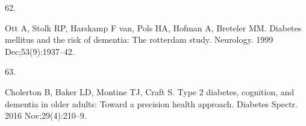 \documentclass[
  a4paper,
]{article}
\newlength{\cslhangindent}
\newlength{\csllabelwidth}
\newlength{\cslentryspacingunit} %
\newenvironment{CSLReferences}[2] %
 {%
  \setlength{\parindent}{0pt}
  \ifodd #1
  \let\oldpar\par
  \def\par{\hangindent=\cslhangindent\oldpar}
  \fi
  \setlength{\parskip}{#2\cslentryspacingunit}
 }%
 {}
\newcommand{\CSLLeftMargin}[1]{\parbox[t]{\csllabelwidth}{#1}}
\newcommand{\CSLRightInline}[1]{\parbox[t]{\linewidth - \csllabelwidth}{#1}\break}
\begin{document}
\begin{CSLReferences}{0}{0}
\leavevmode{}%
\CSLLeftMargin{62. }%
\CSLRightInline{Ott A, Stolk RP, Harskamp F van, Pols HA, Hofman A,
Breteler MM. Diabetes mellitus and the risk of dementia: The rotterdam
study. Neurology. 1999 Dec;53(9):1937--42. }

\leavevmode{}%
\CSLLeftMargin{63. }%
\CSLRightInline{Cholerton B, Baker LD, Montine TJ, Craft S. Type 2
diabetes, cognition, and dementia in older adults: Toward a precision
health approach. Diabetes Spectr. 2016 Nov;29(4):210--9. }

\end{CSLReferences}
\end{document}
